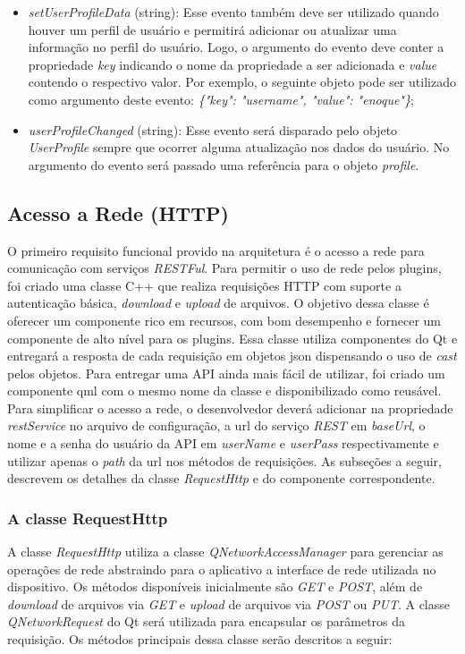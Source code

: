 \begin{itemize}
\begin{itemize}
		\item \textit{setUserProfileData} (string): Esse evento também deve ser utilizado quando houver um perfil de usuário e permitirá adicionar ou atualizar uma informação no perfil do usuário. Logo, o argumento do evento deve conter a propriedade \textit{key} indicando o nome da propriedade a ser adicionada e \textit{value} contendo o respectivo valor. Por exemplo, o seguinte objeto pode ser utilizado como argumento deste evento: \textit{\{"key": "username", "value": "enoque"\}};

		\item \textit{userProfileChanged} (string): Esse evento será disparado pelo objeto \textit{UserProfile} sempre que ocorrer alguma atualização nos dados do usuário. No argumento do evento será passado uma referência para o objeto \textit{profile}.
	\end{itemize}
\end{itemize}


\subsection{Acesso a Rede (HTTP)}\label{sec:solucao-desenvolvida}
O primeiro requisito funcional provido na arquitetura é o acesso a rede para comunicação com serviços \textit{RESTFul}. Para permitir o uso de rede pelos plugins, foi criado uma classe C++ que realiza requisições HTTP com suporte a autenticação básica, \textit{download} e \textit{upload} de arquivos. O objetivo dessa classe é oferecer um componente rico em recursos, com bom desempenho e fornecer um componente de alto nível para os plugins. Essa classe utiliza componentes do Qt e entregará a resposta de cada requisição em objetos json dispensando o uso de \textit{cast} pelos objetos. Para entregar uma API ainda mais fácil de utilizar, foi criado um componente qml com o mesmo nome da classe e disponibilizado como reusável. Para simplificar o acesso a rede, o desenvolvedor deverá adicionar na propriedade \textit{restService} no arquivo de configuração, a url do serviço \textit{REST} em \textit{baseUrl}, o nome e a senha do usuário da API em \textit{userName} e \textit{userPass} respectivamente e utilizar apenas o \textit{path} da url nos métodos de requisições. As subseções a seguir, descrevem os detalhes da classe \textit{RequestHttp} e do componente correspondente.

\subsubsection{A classe RequestHttp}\label{sec:solucao-desenvolvida}
A classe \textit{RequestHttp} utiliza a classe \textit{QNetworkAccessManager} para gerenciar as operações de rede abstraindo para o aplicativo a interface de rede utilizada no dispositivo. Os métodos disponíveis inicialmente são \textit{GET} e \textit{POST}, além de \textit{download} de arquivos via \textit{GET} e \textit{upload} de arquivos via \textit{POST} ou \textit{PUT}. A classe \textit{QNetworkRequest} do Qt será utilizada para encapsular os parâmetros da requisição. Os métodos principais dessa classe serão descritos a seguir:


